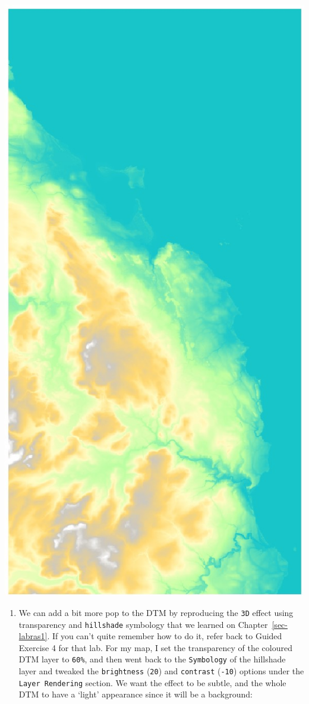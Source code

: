 \documentclass[
  letterpaper,
  DIV=11,
  numbers=noendperiod]{scrreprt}
\providecommand{\tightlist}{%
  \setlength{\itemsep}{0pt}\setlength{\parskip}{0pt}}\usepackage{longtable,booktabs,array}
\begin{document}
\includegraphics{images/lab_7/lab7_fig6_coldem.jpg}

\begin{enumerate}
\def\labelenumi{(\arabic{enumi})}
\setcounter{enumi}{203}
\tightlist
\item
  We can add a bit more pop to the DTM by reproducing the \texttt{3D}
  effect using transparency and \texttt{hillshade} symbology that we
  learned on Chapter~\ref{sec-labras1}. If you can't quite remember how
  to do it, refer back to Guided Exercise 4 for that lab. For my map, I
  set the transparency of the coloured DTM layer to \texttt{60\%}, and
  then went back to the \texttt{Symbology} of the hillshade layer and
  tweaked the \texttt{brightness} (\texttt{20}) and \texttt{contrast}
  (\texttt{-10}) options under the \texttt{Layer\ Rendering} section. We
  want the effect to be subtle, and the whole DTM to have a `light'
  appearance since it will be a background:
\end{enumerate}
\end{document}
